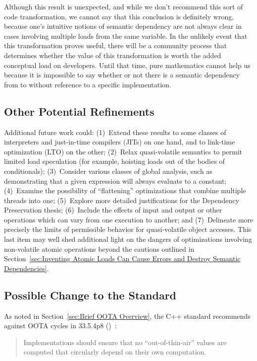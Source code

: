 Although this result is unexpected, and while we don't recommend this sort of
code transformation, we cannot say that this conclusion is definitely
wrong, because one's intuitive notions of semantic dependency are not
always clear in cases involving multiple loads from the same variable.
In the unlikely event that this transformation proves useful, there
will be a community process that determines whether the value of this
transformation is worth the added conceptual load on developers.
Until that time, pure mathematics cannot help us because it is
impossible to say whether or not there is a semantic dependency from
 to  without reference to a specific implementation.

\subsection{Other Potential Refinements}
\label{sec:Other Potential Refinements}

Additional future work could:
(1)~Extend these results to some classes of interpreters and just-in-time
compilers (JITs) on
one hand, and to link-time optimization (LTO) on the other;
(2)~Relax quasi-volatile semantics to permit limited load speculation
(for example, hoisting loads out of the bodies of conditionals);
(3)~Consider various classes of global analysis, such as
demonstrating that a given expression will always evaluate to a constant;
(4)~Examine the possibility of ``flattening'' optimizations that combine
multiple threads into one;
(5)~Explore more detailed justifications for the Dependency Preservation thesis;
(6)~Include the effects of input and output or other operations which
can vary from one execution to another; and
(7)~Delineate more precisely the limits of permissible behavior for
quasi-volatile object accesses.
This last item may well shed additional light on the dangers of
optimizations involving non-volatile atomic operations beyond the cautions
outlined in
Section~\ref{sec:Inventing Atomic Loads Can Cause Errors and
Destroy Semantic Dependencies}.

\subsection{Possible Change to the Standard}
\label{sec:Possible Change to the Standard}

As noted in Section~\ref{sec:Brief OOTA Overview}, the C++
standard recommends against OOTA cycles in 33.5.4p8
()~\cite{ThomasKoeppe2023N4950}:
\begin{quote}
	Implementations should ensure that no ``out-of-thin-air'' values
	are computed that circularly depend on their own computation.
\end{quote}

